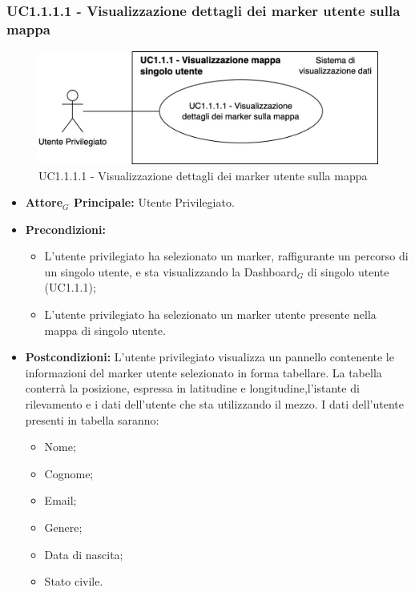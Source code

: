 \documentclass[11pt]{article}
\begin{document}
\begin{justify}
\subsubsection{\textbf{UC1.1.1.1 - Visualizzazione dettagli dei marker utente sulla mappa}}
\begin{figure}[H]
    \centering
    \includegraphics[width=0.7\linewidth]{UC1.1.1.1image.png}
    \caption{UC1.1.1.1 - Visualizzazione dettagli dei marker utente sulla mappa}
    \label{fig:UC1.1.1.1}
\end{figure}
\label{UC1.1.1.1}
\begin{itemize}
     \item \textbf{Attore$_G$ Principale:} Utente Privilegiato.
     \item \textbf{Precondizioni:}
        \begin{itemize}
        \item L'utente privilegiato ha selezionato un marker, raffigurante un percorso di un singolo utente, e sta visualizzando la Dashboard$_G$ di singolo utente (UC1.1.1);
          \item L'utente privilegiato ha selezionato un marker utente presente nella mappa di singolo utente.
        \end{itemize}
      \item \textbf{Postcondizioni:} L'utente privilegiato visualizza un pannello contenente le informazioni del marker utente selezionato in forma tabellare. La tabella conterrà la posizione, espressa in latitudine e longitudine,l'istante di rilevamento e i dati dell'utente che sta utilizzando il mezzo. I dati dell'utente presenti in tabella saranno:
        \begin{itemize}
        \item Nome;
        \item Cognome;
        \item Email;
        \item Genere;
        \item Data di nascita;
        \item Stato civile.
        \end{itemize}

\end{itemize}
\end{justify}
\end{document}
